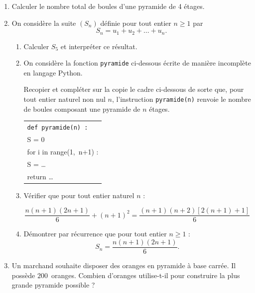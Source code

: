 \begin{enumerate}
\item Calculer le nombre total de boules d'une pyramide de 4 étages.
\item On considère la suite $\left(S_n\right)$ définie pour tout entier $n \geqslant 1$ par 
\[S_n = u_1 + u_2 + \ldots + u_n.\]

	\begin{enumerate}
		\item Calculer $S_5$ et interpréter ce résultat.
		\item On considère la fonction \texttt{pyramide} ci-dessous écrite de manière incomplète en langage Python.
		
Recopier et compléter sur la copie le cadre ci-dessous de sorte que, pour tout entier naturel non nul $n$, l'instruction \texttt{pyramide(n)} renvoie le nombre de boules composant une pyramide de $n$ étages.

\begin{center}

\begin{tabular}{|l|}\hline
\texttt{def pyramide(n) :}\\
\qquad S = 0\\
\qquad for i in range(1,~n+1) :\\
\qquad \qquad S = \ldots\\
\qquad return \ldots\\ \hline
\end{tabular}

\end{center}

		\item Vérifier que pour tout entier naturel $n$ :

\[\dfrac{n(n+1)(2n+1)}{6} + (n+1)^2 = \dfrac{(n + 1)(n +2)[2(n + 1) + 1]}{6}\]
		\item Démontrer par récurrence que pour tout entier $n \geqslant 1$ : 
\[S_n = \dfrac{n(n + 1)(2n + 1)}{6}.\]

	\end{enumerate}
\item Un marchand souhaite disposer des oranges en pyramide à base carrée. Il possède $200$~oranges. Combien d'oranges utilise-t-il pour construire la plus grande pyramide possible ?
\end{enumerate}

\bigskip
